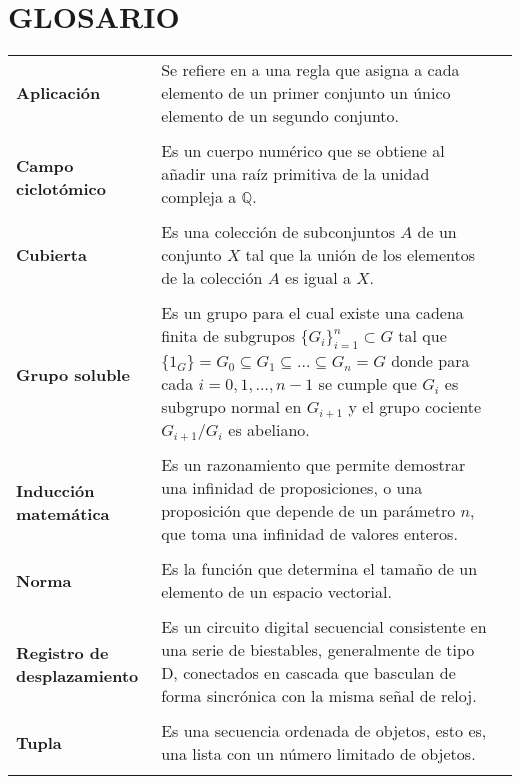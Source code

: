 \chapter*{GLOSARIO}
\vspace{.5cm}
\begin{flushleft}
\renewcommand{\arraystretch}{1} %
\begin{longtable}{@{}l@{\extracolsep{1.6cm}}  p{4.0in}@{} l@{}}
\textbf{Aplicación} & Se refiere en a una regla que asigna a cada elemento de un primer conjunto un único elemento de un segundo conjunto. \\
&\\
\multirow{2}{3cm}{\textbf{Campo ciclotómico}} & Es un cuerpo numérico que se obtiene al añadir una raíz primitiva de la unidad compleja a $\mathds{Q}$.\\
&\\
\textbf{Cubierta} & Es una colección de subconjuntos $A$ de un conjunto $X$ tal que la unión de los elementos de la colección $A$ es igual a $X$. \\
&\\
\multirow{2}{2cm}{\textbf{Grupo soluble}} & Es un grupo para el cual existe una cadena finita de subgrupos $\{G_i\}_{i=1}^{n}\subset G$ tal que
 $\{1_G\}=G_0\subseteq G_1 \subseteq \dots \subseteq G_n = G$ donde para cada $i=0,1,\dots,n-1$ se cumple que $G_i$  es subgrupo normal en $G_{i+1}$ y
 el grupo cociente  $G_{i+1}/G_i$  es abeliano.\\
&\\
\multirow{2}{3cm}{\textbf{Inducción matemática}} & Es un razonamiento que permite demostrar una infinidad de proposiciones, o una proposición que depende de un parámetro $n$, que toma una infinidad de valores enteros.\\
&\\
\textbf{Norma} & Es la función que determina el tamaño de un elemento de un espacio vectorial.\\
&\\
\multirow{2}{3.5cm}{\textbf{Registro de desplazamiento}} &  Es un circuito digital secuencial consistente en una serie de biestables, generalmente de tipo D, conectados en cascada que basculan de forma sincrónica con la misma señal de reloj.\\
&\\
\textbf{Tupla} & Es una secuencia ordenada de objetos, esto es, una lista con un número limitado de objetos.\\
&\\
\end{longtable}
\end{flushleft}



